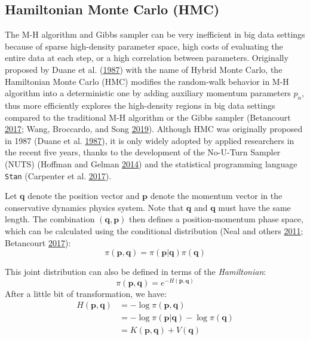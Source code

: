 \documentclass[12pt]{book}
\numberwithin{equation}{chapter}
\begin{document}
\hypertarget{hamiltonian-monte-carlo-hmc}{%
\subsection{Hamiltonian Monte Carlo (HMC)}\label{hamiltonian-monte-carlo-hmc}}

The M-H algorithm and Gibbs sampler can be very inefficient in big data settings because of sparse high-density parameter space, high costs of evaluating the entire data at each step, or a high correlation between parameters. Originally proposed by Duane et al. (\protect\hyperlink{ref-duane1987hybrid}{1987}) with the name of Hybrid Monte Carlo, the Hamiltonian Monte Carlo (HMC) modifies the random-walk behavior in M-H algorithm into a deterministic one by adding auxiliary momentum parameters \(p_n\), thus more efficiently explores the high-density regions in big data settings compared to the traditional M-H algorithm or the Gibbs sampler (Betancourt \protect\hyperlink{ref-betancourt2017conceptual}{2017}; Wang, Broccardo, and Song \protect\hyperlink{ref-wang2019hamiltonian}{2019}). Although HMC was originally proposed in 1987 (Duane et al. \protect\hyperlink{ref-duane1987hybrid}{1987}), it is only widely adopted by applied researchers in the recent five years, thanks to the development of the No-U-Turn Sampler (NUTS) (Hoffman and Gelman \protect\hyperlink{ref-hoffman2014no}{2014}) and the statistical programming language \texttt{Stan} (Carpenter et al. \protect\hyperlink{ref-carpenter2017stan}{2017}).

Let \(\boldsymbol{q}\) denote the position vector and \(\boldsymbol{p}\) denote the momentum vector in the conservative dynamics physics system. Note that \(\boldsymbol{q}\) and \(\boldsymbol{q}\) must have the same length. The combination \((\boldsymbol{q}, \boldsymbol{p})\) then defines a position-momentum phase space, which can be calculated using the conditional distribution (Neal and others \protect\hyperlink{ref-neal2011mcmc}{2011}; Betancourt \protect\hyperlink{ref-betancourt2017conceptual}{2017}):
\[\pi(\boldsymbol{p}, \boldsymbol{q}) = \pi(\boldsymbol{p}|\boldsymbol{q})\pi(\boldsymbol{q})\]

This joint distribution can also be defined in terms of the \emph{Hamiltonian}:
\[\pi(\boldsymbol{p}, \boldsymbol{q}) = e^{-H(\boldsymbol{p}, \boldsymbol{q})}\]
After a little bit of transformation, we have:
\begin{equation}
\begin{aligned}
H(\boldsymbol{p}, \boldsymbol{q}) &= -\log \pi(\boldsymbol{p}, \boldsymbol{q})\\
&= -\log\pi(\boldsymbol{p}|\boldsymbol{q}) - \log\pi(\boldsymbol{q})\\
&= K(\boldsymbol{p}, \boldsymbol{q}) + V(\boldsymbol{q})
\label{eq:hamiltonian}
\end{aligned}
\end{equation}
\end{document}
